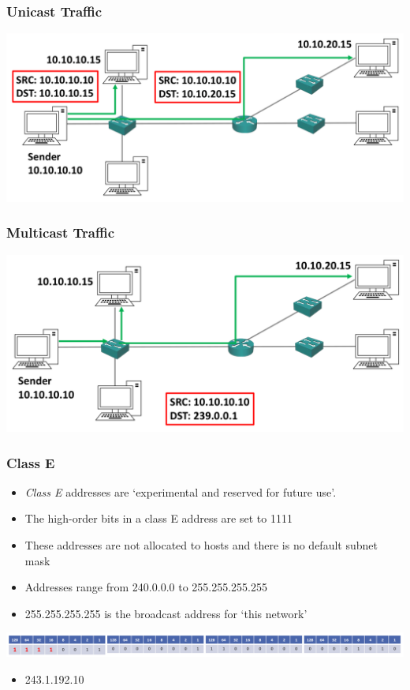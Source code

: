 \documentclass[pdflatex,compress]{beamer}
\begin{document}
\begin{frame}
	\frametitle{Unicast Traffic}
	\begin{center}
		\includegraphics[width=1\linewidth]{img/img08}
	\end{center}
\end{frame}

\begin{frame}
	\frametitle{Multicast Traffic}
	\begin{center}
		\includegraphics[width=1\linewidth]{img/img09}
	\end{center}
\end{frame}

\begin{frame}
	\frametitle{Class E}
	\begin{itemize}
		\item \textit{Class E} addresses are ‘experimental and reserved for future use’.
		\item The high-order bits in a class E address are set to 1111
		\item These addresses are not allocated to hosts and there is no default subnet mask
		\item Addresses range from 240.0.0.0 to 255.255.255.255
		\item 255.255.255.255 is the broadcast address for ‘this network’
	\end{itemize}
	\begin{center}
		\includegraphics[width=1\linewidth]{img/img10}
	\end{center}
	\begin{itemize}
		\item 243.1.192.10
	\end{itemize}
\end{frame}
\end{document}
